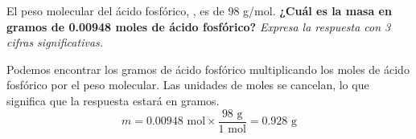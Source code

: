 El peso molecular del ácido fosfórico, , es de 98 g/mol.
\textbf{¿Cuál es la masa en gramos de 0.00948 moles de ácido fosfórico?}
\emph{Expresa la respuesta con 3 cifras significativas.}

\begin{solutionbox}{4cm}
    Podemos encontrar los gramos de ácido fosfórico multiplicando los moles de ácido fosfórico por el peso molecular. Las unidades de moles se cancelan, lo que significa que la respuesta estará en gramos.
    \[ m =  0.00948 \text{ mol} \times \frac{98 \text{ g}}{1 \text{ mol}} = 0.928 \text{ g} \]
\end{solutionbox}